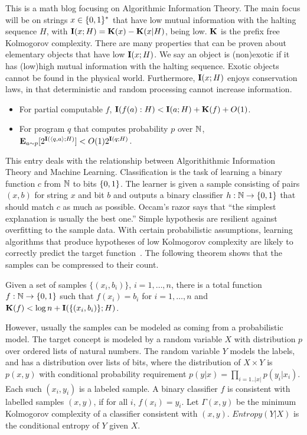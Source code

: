 \documentclass[11pt]{article}\textwidth 6.5in\textheight 9in
\begin{document}
This is a math blog focusing on Algorithmic Information Theory. The main focus will be on strings $x\in\{0,1\}^*$ that have low mutual information with the halting sequence $H$, with ${\mathbf I}(x;H)={\mathbf K}(x)-{\mathbf K}(x|H)$, being low. ${\mathbf K}$ is the prefix free Kolmogorov complexity. There are many properties that can be proven about elementary objects that have low ${\mathbf I}(x;H)$. We say an object is (non)exotic if it has (low)high mutual information with the halting sequence. Exotic objects cannot be found in the physical world. Furthermore, ${\mathbf I}(x;H)$ enjoys conservation laws, in that deterministic and random processing cannot increase information.
\begin{itemize}
\item For partial computable $f$, ${\mathbf I}(f(a):H)< {\mathbf I}(a;H)+{\mathbf K}(f)+O(1)$.
\item For program $q$ that computes probability $p$ over $\mathbb{N}$, ${\mathbf E}_{a\sim p}[2^{{\mathbf I}(\langle q,a\rangle;H)}]< O(1)2^{{\mathbf I}(q;H)}$.
\end{itemize}
This entry deals with the relationship between Algorithithmic Information Theory and Machine Learning. Classification is the task of learning a binary function $c$  from $\mathbb{N}$ to bits $\{0,1\}$. The learner is given a sample consisting of pairs $(x,b)$ for string $x$ and bit $b$ and outputs a binary classifier $h:\mathbb{N}\rightarrow\{0,1\}$ that should match $c$ as much as possible. Occam's razor says that ``the simplest explanation is usually the best one.'' Simple hypothesis are resilient against overfitting to the sample data. With certain probabilistic assumptions, learning algorithms that produce hypotheses of low Kolmogorov complexity are likely to correctly predict the target function~\cite{BlumerEhHaWar89}. The following theorem shows that the samples can be compressed to their count.

\begin{thr}
Given a set of samples $\{(x_i,b_i)\}$, $i=1,\dots,n$, there is a total function $f:\mathbb{N}\rightarrow\{0,1\}$ such that $f(x_i)=b_i$ for $i=1,\dots,n$ and ${\mathbf K}(f)<\log n + {\mathbf I}(\{(x_i,b_i)\};H)$.
\end{thr}


However, usually the samples can be modeled as coming from a probabilistic model. The target concept is modeled by a random variable $X$ with distribution $p$ over ordered lists of natural numbers. The random variable $Y$ models the labels, and has a distribution over lists of bits, where the distribution of $X\times Y$ is $p(x,y)$ with conditional probability requirement $p(y|x)=\prod_{i=1..|x|}p(y_i|x_i)$. Each such $(x_i,y_i)$ is a labeled sample. A binary classifier $f$ is consistent with labelled samples $(x,y)$, if for all $i$, $f(x_i)=y_i$. Let $\Gamma(x,y)$ be the minimum Kolmogorov complexity of a classifier consistent with $(x,y)$. $Entropy(Y|X)$ is the conditional entropy of $Y$ given $X$.
\end{document}
